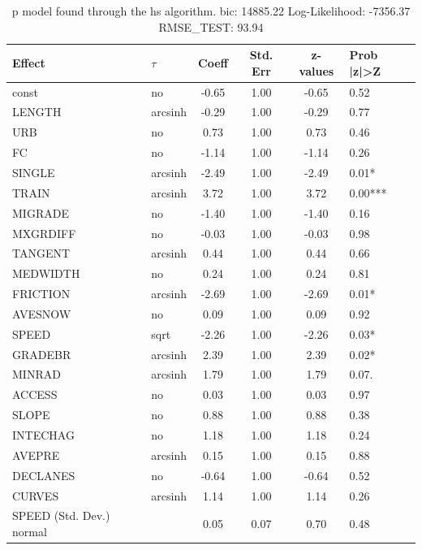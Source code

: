 \begin{table}
	\caption{p model found through the hs algorithm. bic: 14885.22 Log-Likelihood: -7356.37 RMSE_TEST: 93.94}
	\begin{center}
		\begin{tabular}{|l|l|c|c|c|l|}
			\hline
			Effect & $\tau$ & Coeff & Std. Err & z-values & Prob |z|>Z \\
			\hline
			const & no & -0.65 & 1.00 & -0.65 & 0.52 \\
			\hline
			LENGTH & arcsinh & -0.29 & 1.00 & -0.29 & 0.77 \\
			\hline
			URB & no & 0.73 & 1.00 & 0.73 & 0.46 \\
			\hline
			FC & no & -1.14 & 1.00 & -1.14 & 0.26 \\
			\hline
			SINGLE & arcsinh & -2.49 & 1.00 & -2.49 & 0.01* \\
			\hline
			TRAIN & arcsinh & 3.72 & 1.00 & 3.72 & 0.00*** \\
			\hline
			MIGRADE & no & -1.40 & 1.00 & -1.40 & 0.16 \\
			\hline
			MXGRDIFF & no & -0.03 & 1.00 & -0.03 & 0.98 \\
			\hline
			TANGENT & arcsinh & 0.44 & 1.00 & 0.44 & 0.66 \\
			\hline
			MEDWIDTH & no & 0.24 & 1.00 & 0.24 & 0.81 \\
			\hline
			FRICTION & arcsinh & -2.69 & 1.00 & -2.69 & 0.01* \\
			\hline
			AVESNOW & no & 0.09 & 1.00 & 0.09 & 0.92 \\
			\hline
			SPEED & sqrt & -2.26 & 1.00 & -2.26 & 0.03* \\
			\hline
			GRADEBR & arcsinh & 2.39 & 1.00 & 2.39 & 0.02* \\
			\hline
			MINRAD & arcsinh & 1.79 & 1.00 & 1.79 & 0.07. \\
			\hline
			ACCESS & no & 0.03 & 1.00 & 0.03 & 0.97 \\
			\hline
			SLOPE & no & 0.88 & 1.00 & 0.88 & 0.38 \\
			\hline
			INTECHAG & no & 1.18 & 1.00 & 1.18 & 0.24 \\
			\hline
			AVEPRE & arcsinh & 0.15 & 1.00 & 0.15 & 0.88 \\
			\hline
			DECLANES & no & -0.64 & 1.00 & -0.64 & 0.52 \\
			\hline
			CURVES & arcsinh & 1.14 & 1.00 & 1.14 & 0.26 \\
			\hline
			SPEED (Std. Dev.) normal &  & 0.05 & 0.07 & 0.70 & 0.48 \\

\end{tabular}
\end{center}
\end{table}
